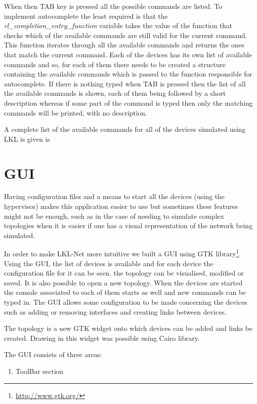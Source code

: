 {{When then TAB key is pressed all the possible commands are listed. To implement autocomplete the least required is that the \textit{rl_completion_entry_function} variable takes the value of the function that checks which of the available commands are still valid for the current command. This function iterates through all the available commands and returns the ones that match the current command. Each of the devices has its own list of available commands and so, for each of them there needs to be created a structure containing the available commands which is passed to the function responsible for autocomplete. If there is nothing typed when TAB is pressed then the list of all the available commands is shown, each of them being followed by a short description whereas if some part of the command is typed then only the matching commands will be printed, with no description.

A complete list of the available commands for all of the devices simulated using LKL is given is 

\section{GUI}
\label{sec:gui}
Having configuration files and a means to start all the devices (using the hypervisor) makes this application easier to use but sometimes these features might not be enough, such as in the case of needing to simulate complex topologies when it is easier if one has a visual representation of the network being simulated.

In order to make LKL-Net more intuitive we built a GUI using GTK library\footnote{\url{http://www.gtk.org/}}. Using the GUI, the list of devices is available and for each device the configuration file for it can be seen, the topology can be visualised, modified or saved. It is also possible to open a new topology. When the devices are started the console associated to each of them starts as well and new commands can be typed in. The GUI allows some configuration to be made concerning the devices such as adding or removing interfaces and creating links between devices.

The topology is a new GTK widget onto which devices can be added and links be created. Drawing in this widget was possible using Cairo library.

The GUI consists of three areas:
\begin{enumerate}
\item ToolBar section


\end{enumerate}}}
